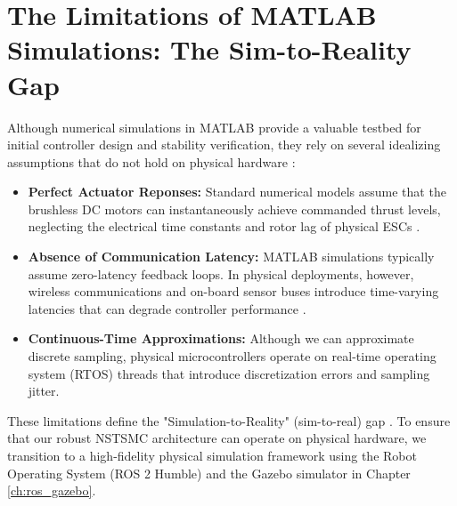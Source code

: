 \section{The Limitations of MATLAB Simulations: The Sim-to-Reality Gap}
Although numerical simulations in MATLAB provide a valuable testbed for initial controller design and stability verification, they rely on several idealizing assumptions that do not hold on physical hardware \cite{ref_86}:
\begin{itemize}
    \item \textbf{Perfect Actuator Reponses:} Standard numerical models assume that the brushless DC motors can instantaneously achieve commanded thrust levels, neglecting the electrical time constants and rotor lag of physical ESCs \cite{ref_87}.
    \item \textbf{Absence of Communication Latency:} MATLAB simulations typically assume zero-latency feedback loops. In physical deployments, however, wireless communications and on-board sensor buses introduce time-varying latencies that can degrade controller performance \cite{ref_86}.
    \item \textbf{Continuous-Time Approximations:} Although we can approximate discrete sampling, physical microcontrollers operate on real-time operating system (RTOS) threads that introduce discretization errors and sampling jitter.
\end{itemize}

These limitations define the "Simulation-to-Reality" (sim-to-real) gap \cite{ref_86}. To ensure that our robust NSTSMC architecture can operate on physical hardware, we transition to a high-fidelity physical simulation framework using the Robot Operating System (ROS 2 Humble) and the Gazebo simulator in Chapter \ref{ch:ros_gazebo}.


